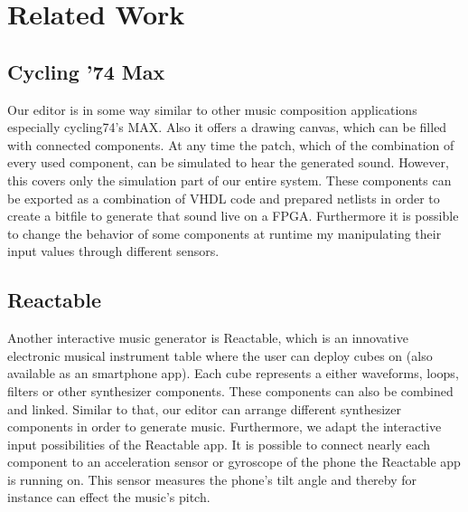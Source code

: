 \chapter{Related Work}
	 
\section{Cycling '74 Max}
	Our editor is in some way similar to other music composition applications especially cycling74's MAX. Also it offers a drawing canvas, which can be filled with connected components. At any time the patch, which of the combination of every used component, can be simulated to hear the generated sound. However, this covers only the simulation part of our entire system. These components can be exported as a combination of VHDL code and prepared netlists in order to create a bitfile to generate that sound live on a FPGA. Furthermore it is possible to change the behavior of some components at runtime my manipulating their input values through different sensors. \\

\section{Reactable}

Another interactive music generator is Reactable, which is an innovative electronic musical instrument table where the user can deploy cubes on (also available as an smartphone app). Each cube represents a either waveforms, loops, filters or other synthesizer components. These components can also be combined and linked. Similar to that, our editor can arrange different synthesizer components in order to generate music. Furthermore, we adapt the interactive input possibilities of the Reactable app. It is possible to connect nearly each component to an acceleration sensor or gyroscope of the phone the Reactable app is running on. This sensor measures the phone's tilt angle and thereby for instance can effect the music's pitch.